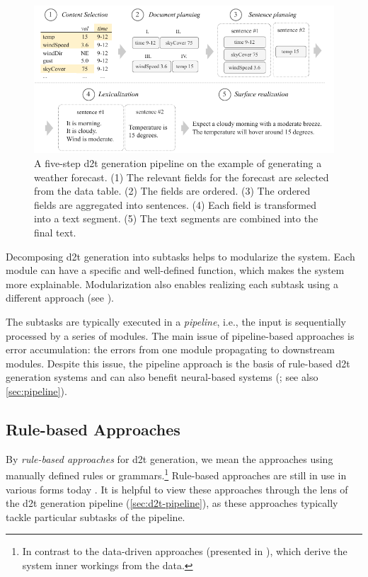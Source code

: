 {\begin{figure}[t]
    \centering
    \includegraphics[width=\textwidth]{img/pipeline.pdf}

    \caption{A five-step \ac{d2t} generation pipeline on the example of generating a weather forecast. (1) The relevant fields for the forecast are selected from the data table. (2) The fields are ordered. (3) The ordered fields are aggregated into sentences. (4) Each field is transformed into a text segment. (5) The text segments are combined into the final text.}\label{fig:pipeline}

\end{figure}


Decomposing \ac{d2t} generation into subtasks helps to modularize the system. Each module can have a specific and well-defined function, which makes the system more explainable. Modularization also enables realizing each subtask using a different approach (see ).

The subtasks are typically executed in a \emph{pipeline}, i.e., the input is sequentially processed by a series of modules. The main issue of pipeline-based approaches is error accumulation: the errors from one module propagating to downstream modules. Despite this issue, the pipeline approach is the basis of rule-based \ac{d2t} generation systems \cite{milleModD2TMultilayerDataset2023} and can also benefit neural-based systems (\citealp{moryossef2019step,puduppullyDatatotextGenerationMacro2021}; see also \autoref{sec:pipeline}).


\subsection{Rule-based Approaches}
\label{sec:rule-d2t}

By \emph{rule-based approaches} for \ac{d2t} generation, we mean the approaches using manually defined rules or grammars.\footnote{In contrast to the data-driven approaches (presented in ), which derive the system inner workings from the data.} Rule-based approaches are still in use in various forms today \cite{gattSurveyStateArt2018,daleNaturalLanguageGeneration2020,daleNavigatingTextGeneration2023}. It is helpful to view these approaches through the lens of the \ac{d2t} generation pipeline (\autoref{sec:d2t-pipeline}), as these approaches typically tackle particular subtasks of the pipeline.


}
